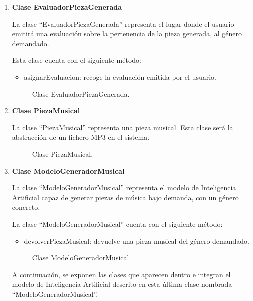 \begin{enumerate}
  \item \textbf{Clase EvaluadorPiezaGenerada}

  La clase ``EvaluadorPiezaGenerada'' representa el lugar donde el usuario emitirá una evaluación sobre la pertenencia de la pieza generada, al género demandado.

  Esta clase cuenta con el siguiente método:

  \begin{itemize}
      \item asignarEvaluacion: recoge la evaluación emitida por el usuario.
  \end{itemize}

  \begin{figure}[H]
    \centering
    
    \caption{Clase EvaluadorPiezaGenerada.}
  \end{figure}

  \item \textbf{Clase PiezaMusical}

  La clase ``PiezaMusical'' representa una pieza musical. Esta clase será la abstracción de un fichero MP3 en el sistema.

  \begin{figure}[H]
    \centering
    
    \caption{Clase PiezaMusical.}
  \end{figure}

  \item \textbf{Clase ModeloGeneradorMusical}

  La clase ``ModeloGeneradorMusical'' representa el modelo de Inteligencia Artificial capaz de generar piezas de música bajo demanda, con un género concreto.

  La clase ``ModeloGeneradorMusical'' cuenta con el siguiente método:

  \begin{itemize}
      \item devolverPiezaMusical: devuelve una pieza musical del género demandado.
  \end{itemize}

  \begin{figure}[H]
    \centering
    
    \caption{Clase ModeloGeneradorMusical.}
  \end{figure}

  A continuación, se exponen las clases que aparecen dentro e integran el modelo de Inteligencia Artificial descrito en esta última clase nombrada ``ModeloGeneradorMusical''.


\end{enumerate}
